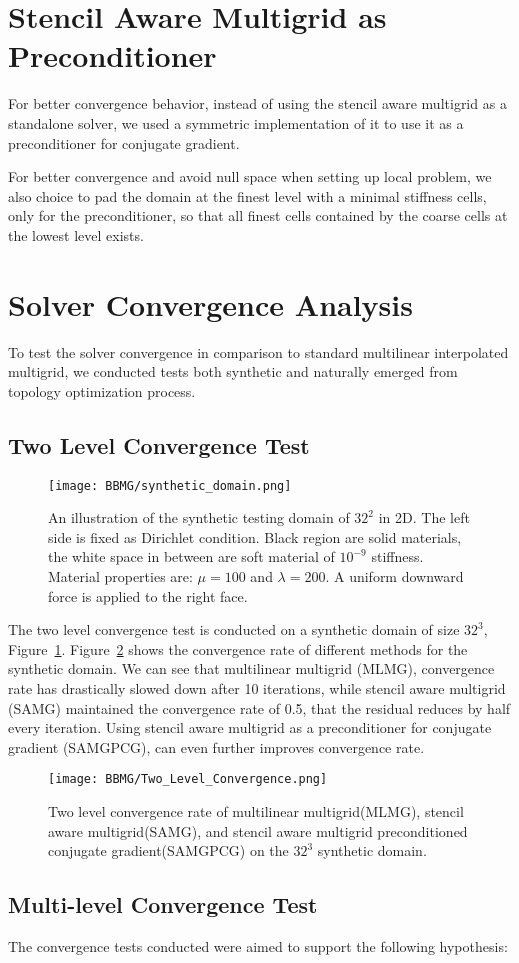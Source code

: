 \section{Stencil Aware Multigrid as Preconditioner}
For better convergence behavior, instead of using the stencil aware multigrid as a standalone solver, we used a symmetric implementation of it to use it as a preconditioner for conjugate gradient.

For better convergence and avoid null space when setting up local problem, we also choice to pad the domain at the finest level with a minimal stiffness cells, only for the preconditioner, so that all finest cells contained by the coarse cells at the lowest level exists. 
 \section{Solver Convergence Analysis}
 To test the solver convergence in comparison to standard multilinear interpolated multigrid, we conducted tests both synthetic and naturally emerged from topology optimization process.
 \subsection{Two Level Convergence Test}
  \begin{figure}[t]
\texttt{[image: BBMG/synthetic\_domain.png]}
\centering
\caption{An illustration of the synthetic testing domain of $32^2$ in 2D. The left side is fixed as Dirichlet condition. Black region are solid materials, the white space in between are soft material of $10^{-9}$ stiffness. Material properties are: $\mu = 100$ and $\lambda = 200$. A uniform downward force is applied to the right face.}
\label{fig:synthetic_domain}
\end{figure}
 The two level convergence test is conducted on a synthetic domain of size $32^3$, Figure~\ref{fig:synthetic_domain}. Figure~\ref{fig:Two_Level_Convergence} shows the convergence rate of different methods for the synthetic domain. We can see that multilinear multigrid (MLMG), convergence rate has drastically slowed down after 10 iterations, while stencil aware multigrid (SAMG) maintained the convergence rate of 0.5, that the residual reduces by half every iteration. Using stencil aware multigrid as a preconditioner for conjugate gradient (SAMGPCG), can even further improves convergence rate.
   \begin{figure}[t]
\texttt{[image: BBMG/Two\_Level\_Convergence.png]}
\centering
\caption{Two level convergence rate of multilinear multigrid(MLMG), stencil aware multigrid(SAMG), and stencil aware multigrid preconditioned conjugate gradient(SAMGPCG) on the $32^3$ synthetic domain.}
\label{fig:Two_Level_Convergence}
\end{figure}
 \subsection{Multi-level Convergence Test}
 The convergence tests conducted were aimed to support the following hypothesis:
 \begin{enumerate}
 \end{enumerate}